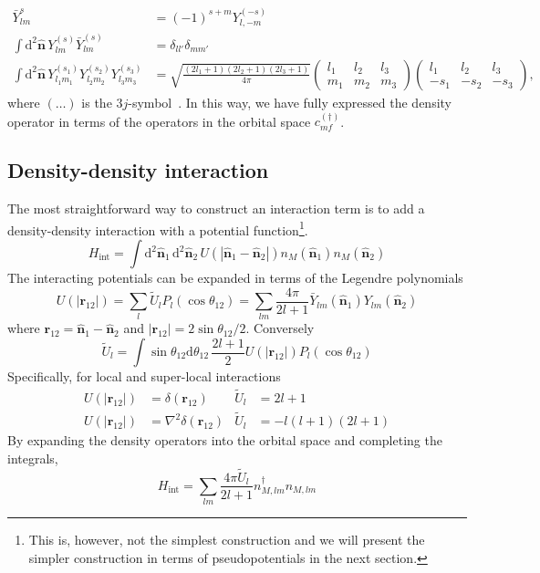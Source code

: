 \documentclass{timesjhep}
\begin{document}
\begin{subequations}
\begin{align}
 \bar{Y}_{lm}^{s}&=(-1)^{s+m}Y_{l,-m}^{(-s)}\\
    \int\mathrm{d}^2\hat{\mathbf{n}}\,Y_{lm}^{(s)}\bar{Y}_{lm}^{(s)}&=\delta_{ll'}\delta_{mm'}\\
    \int\mathrm{d}^2\hat{\mathbf{n}}\,Y_{l_1m_1}^{(s_1)}Y_{l_2m_2}^{(s_2)}Y_{l_3m_3}^{(s_3)}&=\sqrt{\frac{(2l_1+1)(2l_2+1)(2l_3+1)}{4\pi}}\begin{pmatrix}l_1&l_2&l_3\\m_1&m_2&m_3\end{pmatrix}\begin{pmatrix}l_1&l_2&l_3\\-s_1&-s_2&-s_3\end{pmatrix},
\end{align} 
\end{subequations}
where $(\dots)$ is the $3j$-symbol~\cite{Biedenharn1984Angular}. In this way, we have fully expressed the density operator in terms of the operators in the orbital space $c^{(\dagger)}_{mf}$. 

\subsection{Density-density interaction}
\label{sec:construct_denint}

The most straightforward way to construct an interaction term is to add a density-density interaction with a potential function\footnote{This is, however, not the simplest construction and we will present the simpler construction in terms of pseudopotentials in the next section.}.
\begin{equation}
    H_\mathrm{int}=\int\mathrm{d}^2\hat{\mathbf{n}}_1\,\mathrm{d}^2\hat{\mathbf{n}}_2\,U(|\hat{\mathbf{n}}_1-\hat{\mathbf{n}}_2|)n_M(\hat{\mathbf{n}}_1)n_M(\hat{\mathbf{n}}_2) 
\end{equation} 
The interacting potentials can be expanded in terms of the Legendre polynomials 
\begin{equation}
    U(|\mathbf{r}_{12}|)=\sum_l\tilde{U}_lP_l(\cos\theta_{12})=\sum_{lm}\frac{4\pi}{2l+1}\bar{Y}_{lm}(\hat{\mathbf{n}}_1)Y_{lm}(\hat{\mathbf{n}}_2)
\end{equation} 
where $\mathbf{r}_{12}=\hat{\mathbf{n}}_1-\hat{\mathbf{n}}_2$ and $|\mathbf{r}_{12}|=2\sin\theta_{12}/2$. Conversely 
\begin{equation}
    \tilde{U}_l=\int\sin\theta_{12}\mathrm{d}\theta_{12}\,\frac{2l+1}{2}U(|\mathbf{r}_{12}|)P_l(\cos\theta_{12})
\end{equation} 
Specifically, for local and super-local interactions 
\begin{align}
    U(|\mathbf{r}_{12}|)&=\delta(\mathbf{r}_{12})&\tilde{U}_l&=2l+1\nonumber\\
    U(|\mathbf{r}_{12}|)&=\nabla^2\delta(\mathbf{r}_{12})&\tilde{U}_l&=-l(l+1)(2l+1)     
\end{align}
By expanding the density operators into the orbital space and completing the integrals, 
\begin{equation}
    H_\mathrm{int}=\sum_{lm}\frac{4\pi \tilde{U}_l}{2l+1}n^\dagger_{M,lm}n_{M,lm}
\end{equation} 
\end{document}
